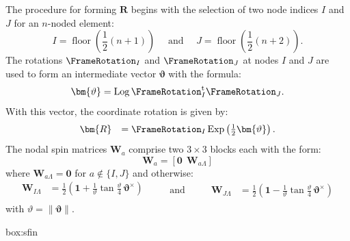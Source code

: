 The procedure for forming \(\bm{R}\) begins
with the selection of two node indices \(I\) and \(J\) for an \(n\)-noded element:
%
\begin{equation*} 
I=\operatorname{floor}\left(\frac{1}{2}(n+1)\right)  
\quad \text { and } \quad  
J=\operatorname{floor}\left(\frac{1}{2}(n+2)\right).
\end{equation*}
%
The rotations \(\FrameRotation_I\) and \(\FrameRotation_J\)
at nodes $I$ and $J$
are used to form an intermediate vector $\bm{\vartheta}$ with the formula:
\[\bm{\vartheta} = \operatorname{Log}\FrameRotation_I^{\mathrm{t}} \FrameRotation_J.\]
With this vector, the coordinate rotation is given by:
%
\begin{equation*} 
\left.\begin{array}{rl}
\bm{R} &= \FrameRotation_I \operatorname{Exp} \left(\frac{1}{2} \bm{\vartheta}\right). \\
\end{array}\right.
\end{equation*}
%
The nodal spin matrices \(\bm{W}_a\) %
comprise two $3\times 3$ blocks each with the form:
%
\begin{equation*} 
\bm{W}_a = \left[\bm{0} ~~ \bm{W}_{a\scriptscriptstyle{\Lambda}}\right]
\end{equation*}
%
where \(\bm{W}_{a\scriptscriptstyle{\Lambda}} = \bm{0}\) for \(a \notin \{I,J\}\) and otherwise:
%
\begin{equation*} 
\begin{aligned}
\bm{W}_{I \Lambda} &= \frac{1}{2}\left(\bm{1} + \frac{1}{\vartheta} \tan \frac{\vartheta}{4} \, \bm{\vartheta}^{\times}\right) \\
\end{aligned}
\qquad\text{ and }\qquad
\begin{aligned}
\bm{W}_{J \Lambda} &=\frac{1}{2}\left(\bm{1} -\frac{1}{\vartheta} \tan \frac{\vartheta}{4} \, \bm{\vartheta}^{\times}\right)
\end{aligned}
\end{equation*}
with \(\vartheta = \|\bm{\vartheta}\|\).

\begin{ambox}{box:sfin}
    
\end{ambox}
